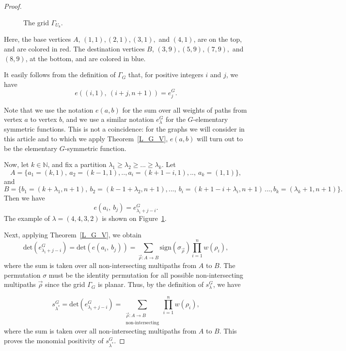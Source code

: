 \documentclass{article}
\theoremstyle{plain}
\theoremstyle{definition}
\begin{document}
\begin{proof}
\begin{figure}[H]
\begin{tikzpicture}[scale=0.9]
\end{tikzpicture}
\caption{The grid $\Gamma_{U_8}.$}
\label{smaingrid}

\end{figure}

Here, the base vertices $A$, $(1,1), (2,1), (3,1),$ and $(4,1)$, are
on the top, and are colored in red. The destination vertices $B$,
$(3,9), (5,9), (7,9),$ and $(8,9)$, at the bottom, and are colored in
blue.

It easily follows from the definition of $\Gamma_G$ that, for positive
integers $i$ and $j$,  we have $$e( (i,1),\ (i+j,n+1) ) = e^G_j.$$

Note that we use the notation $e(a,b)$ for the sum over all weights of
paths from vertex $a$ to vertex $b$, and we use a similar notation
$e^G_{\lambda}$ for the $G$-elementary symmetric functions. This is
not a coincidence: for the graphs  we will consider in this
article and to which we apply Theorem~\ref{L_G_V}, $e(a,b)$ will turn out to be
the elementary $G$-symmetric function.

Now, let $k\in\mathbb{N}$, and fix a partition $\lambda_1\geq
\lambda_2\geq... \geq \lambda_k$.  Let $$A=\{a_1=(k,1),\
a_2=(k-1,1),..,a_i=(k+1-i,1),..,\ a_k =(1,1)\},$$
and $$B=\{b_1=(k+\lambda_1,n+1),\ b_2=(k-1+\lambda_2,n+1),...,\ b_i
=(k+1-i+\lambda_i,n+1)\,...,b_k=(\lambda_k+1,n+1)\}.$$ Then we have $$e( a_i,\
b_j) = e^G_{\lambda_i+j-i}.$$
The example of  $\lambda=(4,4,3,2)$ is shown on  Figure~\ref{smaingrid}.

Next, applying Theorem~\ref{L_G_V}, we obtain 
\begin{equation}\label{sposproof}
\mathrm{det}(e^G_{\lambda_i+j-i} ) = \mathrm{det}(e( a_i,\ b_j)) = \sum\limits_{\vec{\rho}:A\rightarrow B} \mathrm{sign}(\sigma_{\vec{\rho}})\prod\limits_{i=1}^n w(\rho_i),
\end{equation}
where the sum is taken over all non-intersecting multipaths from $A$ to $B$. 
The permutation $\sigma$ must be the identity permutation for all
possible non-intersecting multipaths $\vec{\rho}$ since the grid $\Gamma_G$ is planar. 
Thus, by the definition of $s_{\lambda}^G$, we have

\begin{equation}\label{sposresult}
s^G_{\lambda^*}=\mathrm{det}(e^G_{\lambda_i+j-i} ) = \sum\limits_{\substack{\vec{\rho}:A\rightarrow B \\ \text{non-intersecting}}}\prod\limits_{i=1}^n w(\rho_i),
\end{equation}
where the sum is taken over all non-intersecting multipaths from $A$ to $B$. This proves the monomial positivity of $s_{\lambda^*}^G.$
\end{proof}
\end{document}
